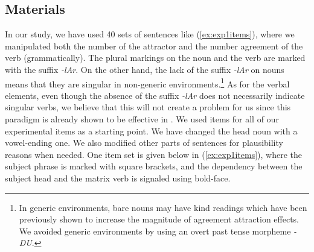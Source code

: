 \subsection{Materials}

In our study, we have used 40 sets of sentences like (\ref{ex:exp1items}), where we manipulated both the number of the attractor and the number agreement of the verb (grammatically). The plural markings on the noun and the verb are marked with the suffix \textit{-lAr}. On the other hand, the lack of the suffix \textit{-lAr} on nouns means that they are singular in non-generic environments.\footnote{In generic environments, bare nouns may have kind readings which have been previously shown to increase the magnitude of agreement attraction effects. We avoided generic environments by using an overt past tense morpheme \emph{-DU}.} As for the verbal elements, even though the absence of the suffix \textit{-lAr} does not necessarily indicate singular verbs, we believe that this will not create a problem for us since this paradigm is already shown to be effective in . We used \cites{LagoEtAl2019} items for all of our experimental items as a starting point. We have changed the head noun with a vowel-ending one. We also modified other parts of sentences for plausibility reasons when needed. One item set is given below in (\ref{ex:exp1items}), where the subject phrase is marked with square brackets, and the dependency between the subject head and the matrix verb is signaled using bold-face.

